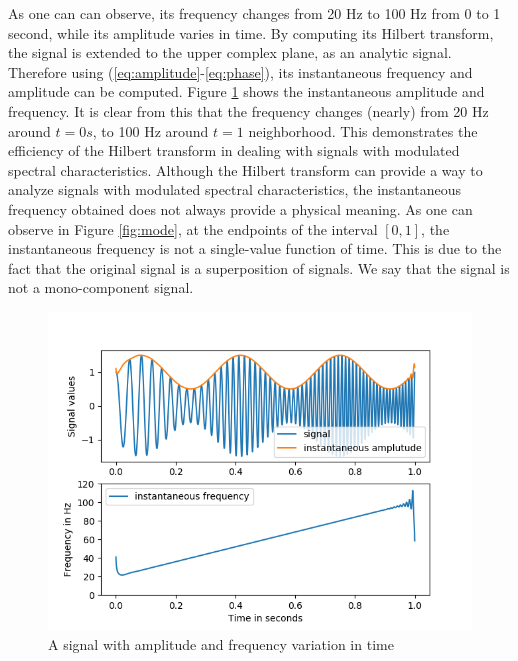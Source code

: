 \documentclass[../Main/thesis.tex]{subfiles}
\begin{document}
\justify
As one can can observe, its frequency changes from 20 Hz to 100 Hz from 0 to 1 second, while its amplitude varies in time. By computing its Hilbert transform, the signal is extended to the upper complex plane, as an analytic signal. Therefore using (\ref{eq:amplitude}-\ref{eq:phase}), its instantaneous frequency and amplitude can be computed.
\justify
Figure \ref{fig:inst} shows the instantaneous amplitude and frequency. It is clear from this that the frequency changes (nearly) from 20 Hz around $t = 0s$, to 100 Hz around $t = 1$ neighborhood. This demonstrates the efficiency of the Hilbert transform in dealing with signals with modulated spectral characteristics. 
\justify
Although the Hilbert transform can provide a way to analyze signals with modulated spectral characteristics, the instantaneous frequency obtained does not always provide a physical meaning. As one can observe in Figure \ref{fig:mode}, at the endpoints of the interval $[0,1]$, the instantaneous frequency is not a single-value function of time. This is due to the fact that the original signal is a superposition of signals. We say that the signal is not a mono-component signal.
\begin{figure}[H]
	\centering
	\includegraphics[width=1\linewidth]{../fig/inst}
	\caption{A signal with amplitude and frequency variation in time}
	\label{fig:inst}
\end{figure}
\justify
\end{document}

